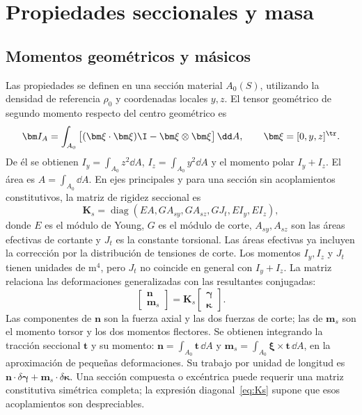 \FloatBarrier
\section{Propiedades seccionales y masa}
\subsection{Momentos geométricos y másicos}
Las propiedades se definen en una sección material $A_0(S)$, utilizando la densidad de referencia $\rho_0$ y coordenadas locales $y,z$. El tensor geométrico de segundo momento respecto del centro geométrico es
\begin{equation}
\bm I_A=\int_{A_0}
\big[(\bm\xi\cdot\bm\xi)\I-\bm\xi\otimes\bm\xi\big]\,\dd A,
\qquad \bm\xi=[0,y,z]^\tr.
\end{equation}
De él se obtienen $I_y=\int_{A_0}z^2\dd A$, $I_z=\int_{A_0}y^2\dd A$ y el momento polar $I_y+I_z$. El área es $A=\int_{A_0}\dd A$. En ejes principales y para una sección sin acoplamientos constitutivos, la matriz de rigidez seccional es
\begin{equation}
\bm K_s=\operatorname{diag}(EA,GA_{sy},GA_{sz},GJ_t,EI_y,EI_z),
\label{eq:Ks}
\end{equation}
donde $E$ es el módulo de Young, $G$ es el módulo de corte, $A_{sy},A_{sz}$ son las áreas efectivas de cortante y $J_t$ es la constante torsional. Las áreas efectivas ya incluyen la corrección por la distribución de tensiones de corte. Los momentos $I_y,I_z$ y $J_t$ tienen unidades de $\mathrm{m^4}$, pero $J_t$ no coincide en general con $I_y+I_z$. La matriz relaciona las deformaciones generalizadas con las resultantes conjugadas:
\begin{equation}
\begin{bmatrix}\bm n\\\bm m_s\end{bmatrix}
=\bm K_s\begin{bmatrix}\bm\gamma\\\bm\kappa\end{bmatrix}.
\label{eq:constitutiva}
\end{equation}
Las componentes de $\bm n$ son la fuerza axial y las dos fuerzas de corte; las de $\bm m_s$ son el momento torsor y los dos momentos flectores. Se obtienen integrando la tracción seccional $\bm t$ y su momento: $\bm n=\int_{A_0}\bm t\,\dd A$ y $\bm m_s=\int_{A_0}\bm\xi\times\bm t\,\dd A$, en la aproximación de pequeñas deformaciones. Su trabajo por unidad de longitud es $\bm n\cdot\delta\bm\gamma+\bm m_s\cdot\delta\bm\kappa$. Una sección compuesta o excéntrica puede requerir una matriz constitutiva simétrica completa; la expresión diagonal~\eqref{eq:Ks} supone que esos acoplamientos son despreciables.

